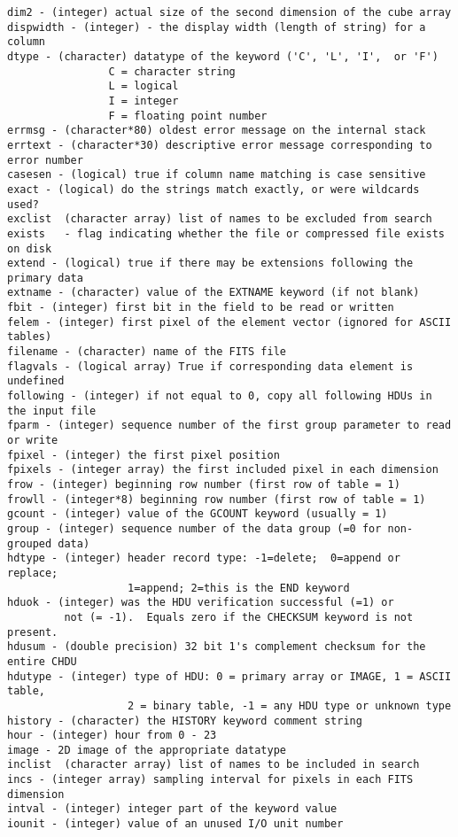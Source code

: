 \documentclass[11pt]{book}
\begin{document}
\begin{verbatim}
dim2 - (integer) actual size of the second dimension of the cube array
dispwidth - (integer) - the display width (length of string) for a column
dtype - (character) datatype of the keyword ('C', 'L', 'I',  or 'F')
                C = character string
                L = logical
                I = integer
                F = floating point number
errmsg - (character*80) oldest error message on the internal stack
errtext - (character*30) descriptive error message corresponding to error number
casesen - (logical) true if column name matching is case sensitive
exact - (logical) do the strings match exactly, or were wildcards used?
exclist  (character array) list of names to be excluded from search
exists   - flag indicating whether the file or compressed file exists on disk
extend - (logical) true if there may be extensions following the primary data
extname - (character) value of the EXTNAME keyword (if not blank)
fbit - (integer) first bit in the field to be read or written
felem - (integer) first pixel of the element vector (ignored for ASCII tables)
filename - (character) name of the FITS file
flagvals - (logical array) True if corresponding data element is undefined
following - (integer) if not equal to 0, copy all following HDUs in the input file
fparm - (integer) sequence number of the first group parameter to read or write
fpixel - (integer) the first pixel position
fpixels - (integer array) the first included pixel in each dimension
frow - (integer) beginning row number (first row of table = 1)
frowll - (integer*8) beginning row number (first row of table = 1)
gcount - (integer) value of the GCOUNT keyword (usually = 1)
group - (integer) sequence number of the data group (=0 for non-grouped data)
hdtype - (integer) header record type: -1=delete;  0=append or replace;
                   1=append; 2=this is the END keyword
hduok - (integer) was the HDU verification successful (=1) or
         not (= -1).  Equals zero if the CHECKSUM keyword is not present.
hdusum - (double precision) 32 bit 1's complement checksum for the entire CHDU
hdutype - (integer) type of HDU: 0 = primary array or IMAGE, 1 = ASCII table,
                   2 = binary table, -1 = any HDU type or unknown type
history - (character) the HISTORY keyword comment string
hour - (integer) hour from 0 - 23
image - 2D image of the appropriate datatype
inclist  (character array) list of names to be included in search
incs - (integer array) sampling interval for pixels in each FITS dimension
intval - (integer) integer part of the keyword value
iounit - (integer) value of an unused I/O unit number

\end{verbatim}
\end{document}
